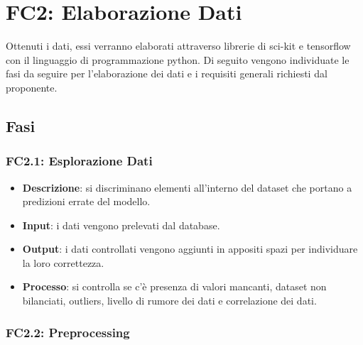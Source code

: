 
\section{FC2: Elaborazione Dati}
Ottenuti i dati, essi verranno elaborati attraverso librerie di sci-kit e tensorflow con il linguaggio di programmazione python.
Di seguito vengono individuate le fasi da seguire per l'elaborazione dei dati e i requisiti generali richiesti dal proponente.

\subsection{Fasi}

\subsubsection{FC2.1: Esplorazione Dati}

\begin{itemize}
	\item \textbf{Descrizione}: si discriminano elementi all'interno del dataset che portano a predizioni errate del modello.
	\item \textbf{Input}: i dati vengono prelevati dal database.
	\item \textbf{Output}: i dati controllati vengono aggiunti in appositi spazi per individuare la loro correttezza.
	\item \textbf{Processo}: si controlla se c'è presenza di valori mancanti, dataset non bilanciati, outliers, livello di rumore dei dati e correlazione dei dati. %
\end{itemize}

\subsubsection{FC2.2: Preprocessing}

